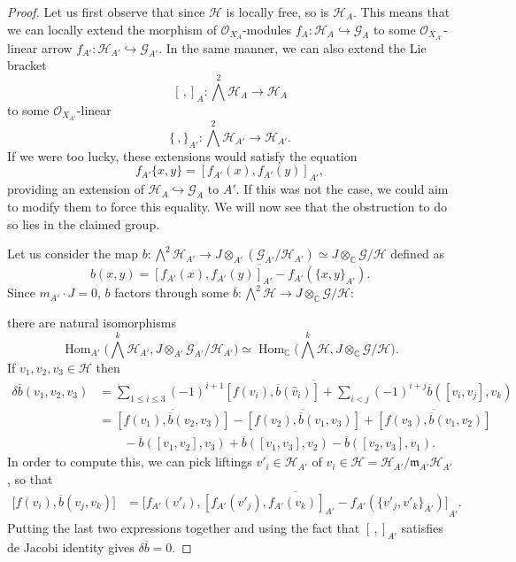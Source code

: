 \documentclass[10pt,a4paper]{amsart}
\newcommand\C{\mathbb{C}}
\DeclareMathOperator{\Hom}{Hom}
\newcommand{\OO}{\mathcal{O}}
\begin{document}
\begin{proof}
Let us first observe that since $\mathcal H$ is locally free,  so is $\mathcal H_{A}$. This means that we can locally extend the morphism 
of $\OO_{X_A}$-modules $f_A:\mathcal{H}_A\hookrightarrow \mathcal{G}_A$ to some $\OO_{X_{A'}}$-linear arrow $f_{A'}:\mathcal{H}_{A'}\hookrightarrow \mathcal{G}_{A'}$.
In the same manner, we can also extend the Lie bracket
$$ [\,,]_A: \bigwedge^2\mathcal H_{A}\to \mathcal H_{A}$$
to some $\OO_{X_{A'}}$-linear
$$ \{\,,\}_{A'}: \bigwedge^2\mathcal H_{A'}\to \mathcal H_{A'}.$$
If we were too lucky, these extensions would satisfy the equation 
$$ f_{A'}\{x,y\}=[f_{A'}(x),f_{A'}(y)]_{A'},$$
providing an extension of $\mathcal H_{A}\hookrightarrow \mathcal G_A$ to $A'$. 
If this was not the case, we could aim to modify them to force this equality. We will now see that the obstruction to do so lies in the claimed group.


Let us consider the map $b:\bigwedge^2\mathcal H_{A'}\to J\otimes_{A'}(\mathcal G_{A'}/\mathcal H_{A'})\simeq J\otimes_\C \mathcal G/\mathcal H$
defined as 
$$ b(x,y)=\overline{[f_{A'}(x),f_{A'}(y)]_{A'}-f_{A'}(\{x,y\}_{A'})}.$$
Since $m_{A'}\cdot J=0$, $b$ factors through some $\overline{b}:\bigwedge^2\mathcal H\to  J\otimes_\C \mathcal G/\mathcal H$:


there are natural isomorphisms 
$$\Hom_{A'}\bigg(\bigwedge^k \mathcal H_{A'}, J\otimes_{A'} \mathcal G_{A'}/\mathcal H_{A'}\bigg)\simeq \Hom_{\C}\bigg(\bigwedge^k\mathcal H,J\otimes_\C \mathcal G/\mathcal H\bigg). $$
If $v_1,v_2,v_3\in \mathcal H$ then
\begin{align*}
    \delta\overline{b}(v_1,v_2,v_3)&= \overline{\sum_{1\leq i\leq 3} (-1)^{i+1}[f(v_i),\overline{b}(\widehat{v}_i)]+\sum_{i<j} (-1)^{i+j}\overline{b}([v_i,v_j],v_k)}\\
    &=\overline{[f(v_1),\overline{b}(v_2,v_3)]}-\overline{[f(v_2),\overline{b}(v_1,v_3)]}+ \overline{[f(v_3),\overline{b}(v_1,v_2)]}\\ &\quad\quad- \overline{b}([v_1,v_2],v_3)+ \overline{b}([v_1,v_3],v_2) - \overline{b}([v_2,v_3],v_1).
\end{align*}
In order to compute this, we can pick liftings $v'_i\in \mathcal H_{A'}$ of $v_i\in \mathcal H=\mathcal H_{A'}/\mathfrak m_{A'}\mathcal H_{A'}$, so that
\begin{align*}
\big[f(v_i),\overline{b}(v_j,v_k)\big]&=\overline{\big[f_{A'}(v'_i),[f_{A'}(v'_j),f_{A'}(v_k)]_{A'}-f_{A'}(\{v'_j,v'_k\}_{A'})\big]}_{A'}.
\end{align*}
Putting the last two expressions together and using the fact that $[ \,,]_{A'}$ satisfies de Jacobi identity gives $\delta \overline{b}=0$.


\end{proof}
\end{document}

